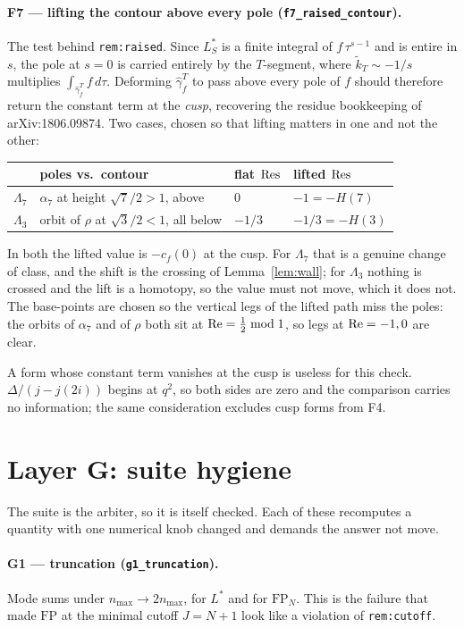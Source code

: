\documentclass[11pt]{article}
\newcommand{\tk}{\widetilde{k}_T}
\newcommand{\code}[1]{\texttt{#1}}
\begin{document}
\paragraph{F7 --- lifting the contour above every pole (\code{f7\_raised\_contour}).}
The test behind \code{rem:raised}. Since $L^*_S$ is a finite integral of $f\,\tau^{s-1}$ and is
entire in $s$, the pole at $s=0$ is carried entirely by the $T$-segment, where $\tk\sim-1/s$
multiplies $\int_{\hat\gamma_f^T}f\,d\tau$. Deforming $\hat\gamma_f^T$ to pass above every pole
of $f$ should therefore return the constant term at the \emph{cusp}, recovering the residue
bookkeeping of arXiv:1806.09874. Two cases, chosen so that lifting matters in one and not the
other:
\begin{center}
\begin{tabular}{@{}llll@{}}
& poles vs.\ contour & flat $\mathop{\rm Res}$ & lifted $\mathop{\rm Res}$\\
\hline
$\Lambda_7$ & $\alpha_7$ at height $\sqrt7/2>1$, above & $0$ & $-1=-H(7)$\\
$\Lambda_3$ & orbit of $\rho$ at $\sqrt3/2<1$, all below & $-1/3$ & $-1/3=-H(3)$\\
\end{tabular}
\end{center}
\noindent In both the lifted value is $-c_f(0)$ at the cusp. For $\Lambda_7$ that is a genuine
change of class, and the shift is the crossing of Lemma~\ref{lem:wall}; for $\Lambda_3$ nothing
is crossed and the lift is a homotopy, so the value must not move, which it does not. The
base-points are chosen so the vertical legs of the lifted path miss the poles: the orbits of
$\alpha_7$ and of $\rho$ both sit at ${\rm Re}=\tfrac12\bmod1$, so legs at ${\rm Re}=-1,0$ are
clear.

A form whose constant term vanishes at the cusp is useless for this check. $\Delta/(j-j(2i))$
begins at $q^2$, so both sides are zero and the comparison carries no information; the same
consideration excludes cusp forms from F4.

\section{Layer G: suite hygiene}

The suite is the arbiter, so it is itself checked. Each of these recomputes a quantity with one
numerical knob changed and demands the answer not move.

\paragraph{G1 --- truncation (\code{g1\_truncation}).}
Mode sums under $n_{\max}\to2n_{\max}$, for $L^*$ and for $\mathrm{FP}_N$. This is the failure
that made $\mathrm{FP}$ at the minimal cutoff $J=N+1$ look like a violation of
\code{rem:cutoff}.
\end{document}
